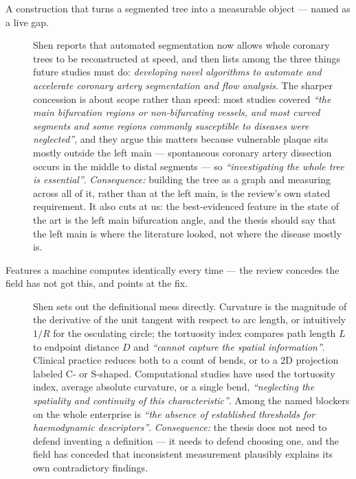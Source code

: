 \begin{description}

\item[A construction that turns a segmented tree into a measurable object --- named as a live gap.]
Shen reports that automated segmentation now allows whole coronary trees to be reconstructed at
speed, and then lists among the three things future studies must do: \emph{developing novel
algorithms to automate and accelerate coronary artery segmentation and flow analysis}.
The sharper concession is about scope rather than speed: most studies covered \emph{``the main
bifurcation regions or non-bifurcating vessels, and most curved segments and some regions commonly
susceptible to diseases were neglected''}, and they argue this matters because vulnerable plaque
sits mostly outside the left main --- spontaneous coronary artery dissection occurs in the middle to
distal segments --- so \emph{``investigating the whole tree is essential''}.
\textit{Consequence:} building the tree as a graph and measuring across all of it, rather than at
the left main, is the review's own stated requirement. It also cuts at us: the best-evidenced
feature in the state of the art is the left main bifurcation angle, and the thesis should say that
the left main is where the literature looked, not where the disease mostly is.

\item[Features a machine computes identically every time --- the review concedes the field has not
got this, and points at the fix.]
Shen sets out the definitional mess directly. Curvature is the magnitude of the derivative of the
unit tangent with respect to arc length, or intuitively $1/R$ for the osculating circle; the
tortuosity index compares path length $L$ to endpoint distance $D$ and \emph{``cannot capture the
spatial information''}. Clinical practice reduces both to a count of bends, or to a 2D projection
labeled C- or S-shaped. Computational studies have used the tortuosity index, average absolute
curvature, or a single bend, \emph{``neglecting the spatiality and continuity of this
characteristic''}. Among the named blockers on the whole enterprise is \emph{``the absence of
established thresholds for haemodynamic descriptors''}.
\textit{Consequence:} the thesis does not need to defend inventing a definition --- it needs to
defend choosing one, and the field has conceded that inconsistent measurement plausibly explains its
own contradictory findings.


\end{description}
